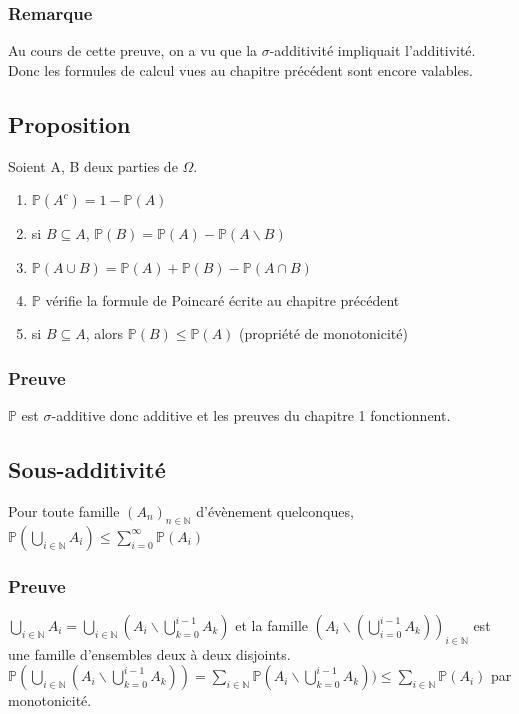 \documentclass[a4paper,10pt]{book} %
\newcommand{\N}{\mathbb{N}}
\renewcommand{\P}{\mathbb{P}} %
\begin{document}
\subsubsection{Remarque}
Au cours de cette preuve, on a vu que la $\sigma$-additivité impliquait l'additivité.\\
Donc les formules de calcul vues au chapitre précédent sont encore valables.

\subsection{Proposition}
Soient A, B deux parties de $\Omega$.\\

\begin{enumerate}
\item $\P(A^c)=1-\P(A)$
\item si $B\subseteq A$, $\P(B)=\P(A)-\P(A\backslash B)$
\item $\P(A\cup B)=\P(A)+\P(B)-\P(A\cap B)$
\item $\P$ vérifie la formule de Poincaré écrite au chapitre précédent
\item si $B\subseteq A$, alors $\P(B)\leq \P(A)$ (propriété de monotonicité)
\end{enumerate}

\subsubsection{Preuve}
$\P$ est $\sigma$-additive donc additive et les preuves du chapitre 1 fonctionnent.

\subsection{Sous-additivité}
Pour toute famille $(A_n)_{n\in \N}$ d'évènement quelconques, $\displaystyle \P(\bigcup_{i\in \N}A_i)\leq \sum_{i=0}^\infty \P(A_i)$

\subsubsection{Preuve}
$\displaystyle \bigcup_{i\in \N}A_i=\bigcup_{i\in \N}(A_i\backslash \bigcup_{k=0}^{i-1}A_k)$ et la famille $\displaystyle (A_i\backslash (\bigcup_{i=0}^{i-1}A_k))_{i\in \N}$ est une famille d'ensembles deux à deux disjoints.\\

$\displaystyle \P(\bigcup_{i\in \N}(A_i\backslash \bigcup_{k=0}^{i-1}A_k))=\sum_{i\in \N}\P(A_i\backslash \bigcup_{k=0}^{i-1}A_k))\leq \sum_{i\in \N}\P(A_i)$ par monotonicité.
\end{document}
